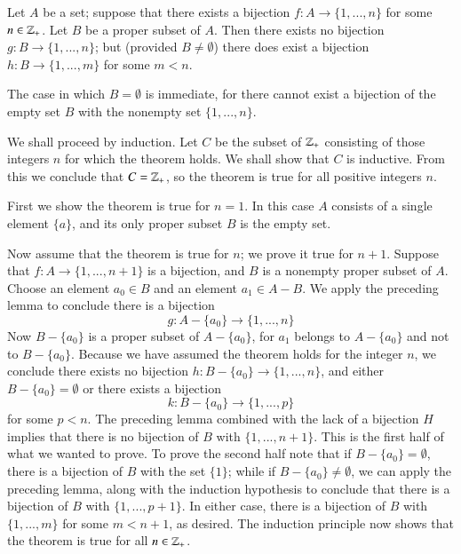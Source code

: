 \documentclass[12pt, a4paper, twoside, openright, titlepage]{book}
\begin{document}
\begin{appendices}
    \begin{thm}{}{}
        Let $A$ be a set; suppose that there exists a bijection $f:A\rightarrow \{1,...,n\}$ for some $n \in \mathbb Z_+$. Let $B$ be a proper subset of $A$. Then there exists no bijection $g:B\rightarrow \{1,...,n\}$; but (provided $B\neq \emptyset$) there does exist a bijection $h:B\rightarrow \{1,...,m\}$ for some $m < n$.
    \end{thm}
    \begin{proof*}{}{}
        The case in which $B = \emptyset$ is immediate, for there cannot exist a bijection of the empty set $B$ with the nonempty set $\{1,...,n\}$.


        We shall proceed by induction. Let $C$ be the subset of $\mathbb Z_+$ consisting of those integers $n$ for which the theorem holds. We shall show that $C$ is inductive. From this we conclude that $C = \mathbb Z_+$, so the theorem is true for all positive integers $n$.

        First we show the theorem is true for $n = 1$. In this case $A$ consists of a single element $\{a\}$, and its only proper subset $B$ is the empty set.

        Now assume that the theorem is true for $n$; we prove it true for $n+1$. Suppose that $f:A\rightarrow \{1,...,n+1\}$ is a bijection, and $B$ is a nonempty proper subset of $A$. Choose an element $a_0 \in B$ and an element $a_1 \in A-B$. We apply the preceding lemma to conclude there is a bijection \begin{equation*}
            g:A-\{a_0\}\rightarrow \{1,...,n\}
        \end{equation*}
        Now $B - \{a_0\}$ is a proper subset of $A - \{a_0\}$, for $a_1$ belongs to $A-\{a_0\}$ and not to $B-\{a_0\}$. Because we have assumed the theorem holds for the integer $n$, we conclude there exists no bijection $h:B-\{a_0\}\rightarrow \{1,...,n\}$, and either $B-\{a_0\} = \emptyset$ or there exists a bijection \begin{equation*}
            k:B-\{a_0\}\rightarrow \{1,...,p\}
        \end{equation*}
        for some $p<n$. The preceding lemma combined with the lack of a bijection $H$ implies that there is no bijection of $B$ with $\{1,...,n+1\}$. This is the first half of what we wanted to prove. To prove the second half note that if $B - \{a_0\} = \emptyset$, there is a bijection of $B$ with the set $\{1\}$; while if $B-\{a_0\} \neq \emptyset$, we can apply the preceding lemma, along with the induction hypothesis to conclude that there is a bijection of $B$ with $\{1,...,p+1\}$. In either case, there is a bijection of $B$ with $\{1,...,m\}$ for some $m < n+1$, as desired. The induction principle now shows that the theorem is true for all $n \in \mathbb Z_+$.
    \end{proof*}


\end{appendices}
\end{document}
